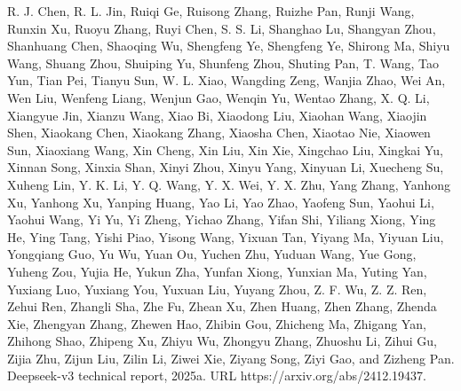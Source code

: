 \documentclass[
  10
]{article}
\begin{document}
R. J. Chen, R. L. Jin, Ruiqi Ge, Ruisong Zhang, Ruizhe Pan, Runji Wang,
Runxin Xu, Ruoyu Zhang, Ruyi Chen, S. S. Li, Shanghao Lu, Shangyan Zhou,
Shanhuang Chen, Shaoqing Wu, Shengfeng Ye, Shengfeng Ye, Shirong Ma,
Shiyu Wang, Shuang Zhou, Shuiping Yu, Shunfeng Zhou, Shuting Pan, T.
Wang, Tao Yun, Tian Pei, Tianyu Sun, W. L. Xiao, Wangding Zeng, Wanjia
Zhao, Wei An, Wen Liu, Wenfeng Liang, Wenjun Gao, Wenqin Yu, Wentao
Zhang, X. Q. Li, Xiangyue Jin, Xianzu Wang, Xiao Bi, Xiaodong Liu,
Xiaohan Wang, Xiaojin Shen, Xiaokang Chen, Xiaokang Zhang, Xiaosha Chen,
Xiaotao Nie, Xiaowen Sun, Xiaoxiang Wang, Xin Cheng, Xin Liu, Xin Xie,
Xingchao Liu, Xingkai Yu, Xinnan Song, Xinxia Shan, Xinyi Zhou, Xinyu
Yang, Xinyuan Li, Xuecheng Su, Xuheng Lin, Y. K. Li, Y. Q. Wang, Y. X.
Wei, Y. X. Zhu, Yang Zhang, Yanhong Xu, Yanhong Xu, Yanping Huang, Yao
Li, Yao Zhao, Yaofeng Sun, Yaohui Li, Yaohui Wang, Yi Yu, Yi Zheng,
Yichao Zhang, Yifan Shi, Yiliang Xiong, Ying He, Ying Tang, Yishi Piao,
Yisong Wang, Yixuan Tan, Yiyang Ma, Yiyuan Liu, Yongqiang Guo, Yu Wu,
Yuan Ou, Yuchen Zhu, Yuduan Wang, Yue Gong, Yuheng Zou, Yujia He, Yukun
Zha, Yunfan Xiong, Yunxian Ma, Yuting Yan, Yuxiang Luo, Yuxiang You,
Yuxuan Liu, Yuyang Zhou, Z. F. Wu, Z. Z. Ren, Zehui Ren, Zhangli Sha,
Zhe Fu, Zhean Xu, Zhen Huang, Zhen Zhang, Zhenda Xie, Zhengyan Zhang,
Zhewen Hao, Zhibin Gou, Zhicheng Ma, Zhigang Yan, Zhihong Shao, Zhipeng
Xu, Zhiyu Wu, Zhongyu Zhang, Zhuoshu Li, Zihui Gu, Zijia Zhu, Zijun Liu,
Zilin Li, Ziwei Xie, Ziyang Song, Ziyi Gao, and Zizheng Pan. Deepseek-v3
technical report, 2025a. URL https://arxiv.org/abs/2412.19437.
\end{document}
